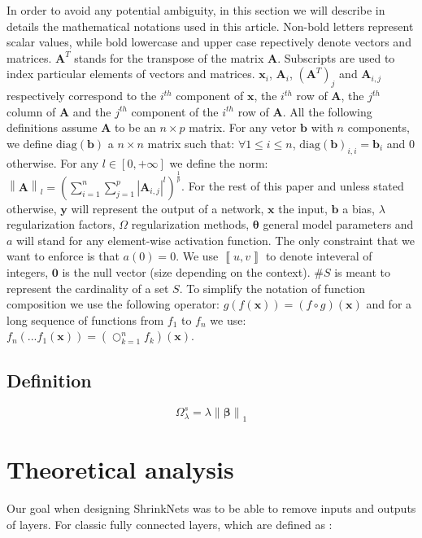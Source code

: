 \documentclass{article}
\newcommand{\norm}[1]{\left\lVert#1\right\rVert}
\newcommand{\abs}[1]{\left|#1\right|}
\newcommand{\diag}[1]{\text{diag}\left(#1\right)}
\newcommand{\intint}[1]{\left\llbracket#1\right\rrbracket}
\begin{document}
\par In order to avoid any potential ambiguity, in this section we will
describe in details the mathematical notations used in this article. Non-bold
letters represent scalar values, while bold lowercase and upper case
repectively denote vectors and matrices. $\bm{A}^T$ stands for the transpose of
the matrix $\bm{A}$. Subscripts are used to index particular elements of
vectors and matrices. $\bm{x}_i$, $\bm{A}_i$, $\left(\bm{A}^T\right)_j$ and
$\bm{A}_{i,j}$ respectively correspond to the $i^{th}$ component of $\bm{x}$,
the $i^{th}$ row of $\bm{A}$, the $j^{th}$ column of $\bm{A}$ and the $j^{th}$
component of the $i^{th}$ row of $\bm{A}$. All the following definitions assume
$\bm{A}$ to be an $n\times p$ matrix.  For any vetor $\bm{b}$ with $n$
components, we define $\diag{\bm{b}}$ a $n\times n$ matrix such that: $\forall
1 \leq i \leq n$, $\diag{\bm{b}}_{i, i} = \bm{b}_i$ and $0$ otherwise.  For any $l \in \left[0, +\infty\right]$ we define the norm: $\norm{\bm{A}}_l =
\left(\sum_{i=1}^n \sum_{j=1}^p \abs{\bm{A}_{i, j}}^l\right)^{\frac{1}{p}}$. For the rest of this paper and unless stated otherwise, $\bm{y}$ will represent the output of a network, $\bm{x}$ the input, $\bm{b}$ a bias, $\lambda$ regularization factors, $\Omega$ regularization methods, $\bm{\theta}$ general model parameters and $a$ will stand for any element-wise activation function. The only constraint that we want to enforce is that $a(0) = 0$. We use $\intint{u, v}$ to denote inteveral of integers, $\bm{0}$ is the null vector (size depending on the context). $\#S$ is meant to represent the cardinality of a set $S$. To simplify the notation of function composition we use the following operator: $g(f(\bm{x})) = (f \circ g)(\bm{x})$ and for a long sequence of functions from $f_1$ to $f_n$ we use: $f_n(...f_1(\bm{x})) = \left(\bigcirc_{k = 1}^n f_k\right)(\bm{x})$.
\subsection{Definition}

\begin{equation}
  \Omega_\lambda^s = \lambda \norm{\bm{\beta}}_1
\end{equation}

\section{Theoretical analysis}

Our goal when designing ShrinkNets was to be able to remove inputs
and outputs of layers. For classic fully connected layers, which are defined
as :
\end{document}

